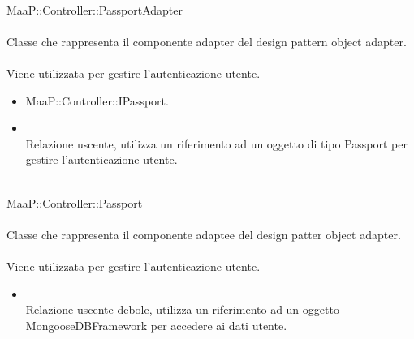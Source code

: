 	\\
	MaaP::Controller::PassportAdapter\\
	\\
	Classe che rappresenta il componente adapter del design pattern object adapter.\\
	\\
	Viene utilizzata per gestire l'autenticazione utente.
	\begin{itemize}
	\item MaaP::Controller::IPassport.
	\end{itemize}
	\begin{itemize}
	\item{}\\
	Relazione uscente, utilizza un riferimento ad un oggetto di tipo Passport per gestire l'autenticazione utente.
	\end{itemize}
	
	\\
	MaaP::Controller::Passport\\
	\\
	Classe che rappresenta il componente adaptee del design patter object adapter.\\
	\\
	Viene utilizzata per gestire l'autenticazione utente.
	\begin{itemize}
	\item{}\\
	Relazione uscente debole, utilizza un riferimento ad un oggetto MongooseDBFramework per accedere ai dati utente.
	\end{itemize}
	
